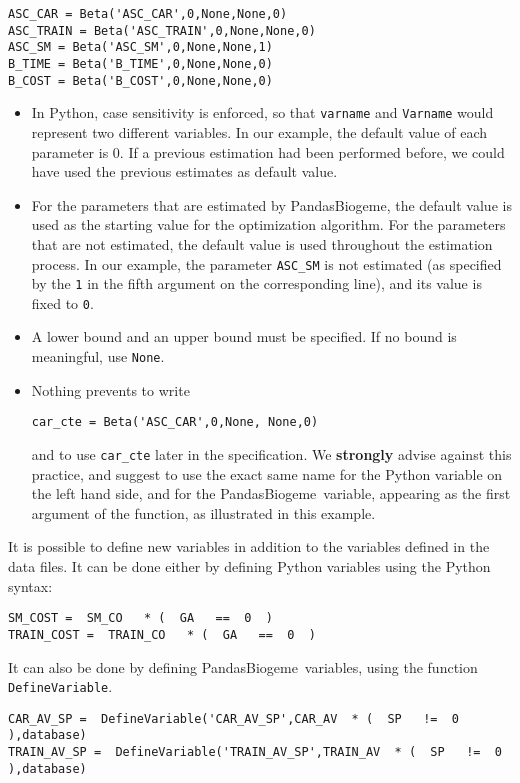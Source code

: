 \documentclass[12pt,a4paper]{article}
\newcommand{\PDBIOGEME}{PandasBiogeme}
\begin{document}
\begin{lstlisting}[style=nonumbers]
ASC_CAR = Beta('ASC_CAR',0,None,None,0)
ASC_TRAIN = Beta('ASC_TRAIN',0,None,None,0)
ASC_SM = Beta('ASC_SM',0,None,None,1)
B_TIME = Beta('B_TIME',0,None,None,0)
B_COST = Beta('B_COST',0,None,None,0)
\end{lstlisting}

\begin{itemize}
\item  In Python, case sensitivity is enforced, so that
\verb+varname+ and \verb+Varname+ would represent two different
variables.  In our example, the default value of each parameter is
0. If a previous estimation had been performed before, we could have
used the previous estimates as default value.
\item For the
parameters that are estimated by \PDBIOGEME, the default value is used
as the starting value for the optimization algorithm. For the
parameters that are not estimated, the default value is used
throughout the estimation process. In our example, the parameter
\lstinline$ASC_SM$ is not estimated (as specified by the \lstinline$1$
in the fifth argument on the corresponding line), and its value is
fixed to \lstinline$0$.
\item 
A lower bound and an upper bound must be
specified. If no bound is meaningful,  use \lstinline$None$.
\item Nothing
prevents to write
\begin{lstlisting}[style=nonumbers]
car_cte = Beta('ASC_CAR',0,None, None,0)
\end{lstlisting}
and to use \lstinline+car_cte+ later in the specification.   We
\textbf{strongly} advise against this practice, and suggest to use the
exact same name for the Python variable on the left hand side, and for
the \PDBIOGEME\ variable, appearing as the first argument of the
function, as illustrated in this example. 
\end{itemize}

It is possible to define new variables in addition to the variables
defined in the data files. It can be done either by defining Python
variables using the Python syntax:
\begin{lstlisting}[style=nonumbers]
SM_COST =  SM_CO   * (  GA   ==  0  ) 
TRAIN_COST =  TRAIN_CO   * (  GA   ==  0  )
\end{lstlisting}
It can also be done by defining \PDBIOGEME\ variables, using the
function \lstinline+DefineVariable+.


\begin{lstlisting}[style=nonumbers]
CAR_AV_SP =  DefineVariable('CAR_AV_SP',CAR_AV  * (  SP   !=  0  ),database)
TRAIN_AV_SP =  DefineVariable('TRAIN_AV_SP',TRAIN_AV  * (  SP   !=  0  ),database)
\end{lstlisting}
\end{document}
